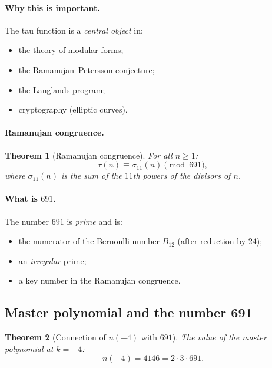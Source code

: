 \documentclass[11pt,a4paper]{article}
\newtheorem{theorem}{Theorem}[section]
\theoremstyle{definition}
\begin{document}
\paragraph{Why this is important.}
The tau function is a \emph{central object} in:
\begin{itemize}
    \item the theory of modular forms;
    \item the Ramanujan--Petersson conjecture;
    \item the Langlands program;
    \item cryptography (elliptic curves).
\end{itemize}

\paragraph{Ramanujan congruence.}
\begin{theorem}[Ramanujan congruence]
\label{thm:ramanujan-congruence}
For all $n \geq 1$:
\begin{equation}
    \boxed{
    \tau(n) \equiv \sigma_{11}(n) \pmod{691},
    }
    \label{eq:ramanujan-congruence}
\end{equation}
where $\sigma_{11}(n)$ is the sum of the $11$th powers of the divisors of $n$.
\end{theorem}

\paragraph{What is $691$.}
The number $691$ is \emph{prime} and is:
\begin{itemize}
    \item the numerator of the Bernoulli number $B_{12}$ 
          (after reduction by $24$);
    \item an \emph{irregular} prime;
    \item a key number in the Ramanujan congruence.
\end{itemize}

\subsection{Master polynomial and the number 691}
\label{subsec:master-691}

\begin{theorem}[Connection of $n(-4)$ with $691$]
\label{thm:n-minus-4-691}
The value of the master polynomial at $k = -4$:
\begin{equation}
    \boxed{
    n(-4) = 4146 = 2 \cdot 3 \cdot 691.
    }
    \label{eq:n-minus-4}
\end{equation}
\end{theorem}
\end{document}
